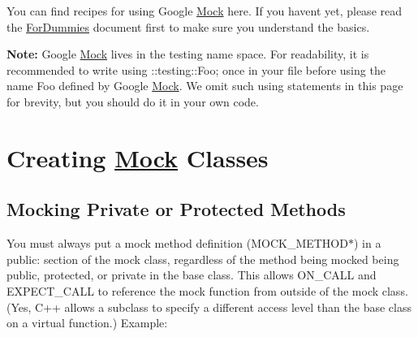 You can find recipes for using Google \mbox{\hyperlink{class_mock}{Mock}} here. If you haven\textquotesingle{}t yet, please read the \mbox{\hyperlink{_obj__test_2lib_2googletest-release-1_88_81_2googlemock_2docs_2_for_dummies_8md}{For\+Dummies}} document first to make sure you understand the basics.

{\bfseries{Note\+:}} Google \mbox{\hyperlink{class_mock}{Mock}} lives in the {\ttfamily testing} name space. For readability, it is recommended to write {\ttfamily using \+::testing\+::\+Foo;} once in your file before using the name {\ttfamily Foo} defined by Google \mbox{\hyperlink{class_mock}{Mock}}. We omit such {\ttfamily using} statements in this page for brevity, but you should do it in your own code.

\section*{Creating \mbox{\hyperlink{class_mock}{Mock}} Classes}

\subsection*{Mocking Private or Protected Methods}

You must always put a mock method definition ({\ttfamily M\+O\+C\+K\+\_\+\+M\+E\+T\+H\+O\+D$\ast$}) in a {\ttfamily public\+:} section of the mock class, regardless of the method being mocked being {\ttfamily public}, {\ttfamily protected}, or {\ttfamily private} in the base class. This allows {\ttfamily O\+N\+\_\+\+C\+A\+LL} and {\ttfamily E\+X\+P\+E\+C\+T\+\_\+\+C\+A\+LL} to reference the mock function from outside of the mock class. (Yes, C++ allows a subclass to specify a different access level than the base class on a virtual function.) Example\+:


\begin{DoxyCode}{0}
\DoxyCodeLine{}
\DoxyCodeLine{}
\DoxyCodeLine{\};}
\DoxyCodeLine{}
\DoxyCodeLine{}
\DoxyCodeLine{\};}
\end{DoxyCode}



